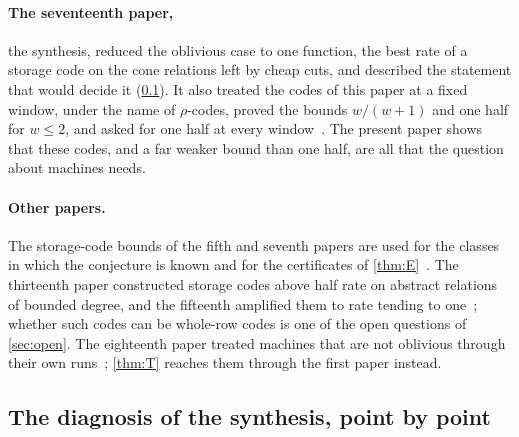 \paragraph{The seventeenth paper,} the synthesis, reduced the oblivious case to one function, the best rate of a
storage code on the cone relations left by cheap cuts, and described the statement that would decide it
(\cref{sec:intro-diagnosis}). It also treated the codes of this paper at a fixed window, under the name of $\rho$-codes, proved the
bounds $w/(w+1)$ and one half for $w\le2$, and asked for one half at every window~\cite{SeventeenthPaper2026}. The
present paper shows that these codes, and a far weaker bound than one half, are all that the question about machines
needs.

\paragraph{Other papers.} The storage-code bounds of the fifth and seventh papers are used for the classes in which
the conjecture is known and for the certificates of \cref{thm:E}~\cite{DirectedRecovery2026,SeventhPaper2026}. The
thirteenth paper constructed storage codes above half rate on abstract relations of bounded degree, and the
fifteenth amplified them to rate tending to one~\cite{StorageCodes2026,HighRate2026}; whether such codes can be whole-row codes is one of the open questions of
\cref{sec:open}. The eighteenth paper treated machines that are not oblivious through their own
runs~\cite{AdaptiveTransfer2026}; \cref{thm:T} reaches them through the first paper instead.

\subsection{The diagnosis of the synthesis, point by point}\label{sec:intro-diagnosis}

